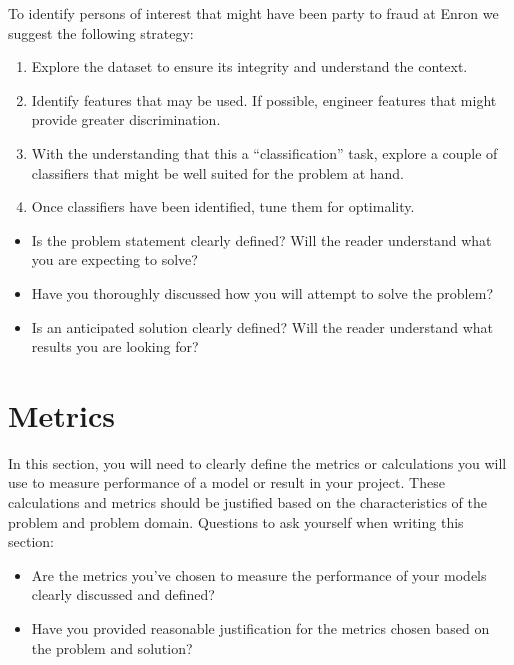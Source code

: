 \documentclass[twoside,openright,titlepage,numbers=noenddot,headinclude,%
               footinclude=true,cleardoublepage=empty,abstractoff,BCOR=5mm,%
               paper=a4,fontsize=11pt,ngerman,american]{scrreprt}
\numberwithin{theorem}{chapter}
\numberwithin{definition}{chapter}
\numberwithin{algorithm}{chapter}
\numberwithin{figure}{chapter}
\numberwithin{table}{chapter}
\numberwithin{equation}{chapter}
\begin{document}
To identify persons of interest that might have been party to fraud at Enron we suggest the following strategy:
\begin{enumerate}%
\item Explore the dataset to ensure its integrity and understand the context.
\item Identify features that may be used. If possible, engineer features that might provide greater discrimination.
\item With the understanding that this a ``classification'' task, explore a couple of classifiers that might be well suited for the problem at hand.
\item Once classifiers have been identified, tune them for optimality.
\end{enumerate}



\begin{itemize}%
\item Is the problem statement clearly defined? Will the reader understand what you are expecting to solve?
\item Have you thoroughly discussed how you will attempt to solve the problem?
\item Is an anticipated solution clearly defined? Will the reader understand what results you are looking for?
\end{itemize}


\section*{Metrics}

In this section, you will need to clearly define the metrics or calculations you will use to measure performance of a model or result in your project. These calculations and metrics should be justified based on the characteristics of the problem and problem domain. Questions to ask yourself when writing this section:
\begin{itemize}%
\item Are the metrics you’ve chosen to measure the performance of your models clearly discussed and defined?
\item Have you provided reasonable justification for the metrics chosen based on the problem and solution?
\end{itemize}

\end{document}

